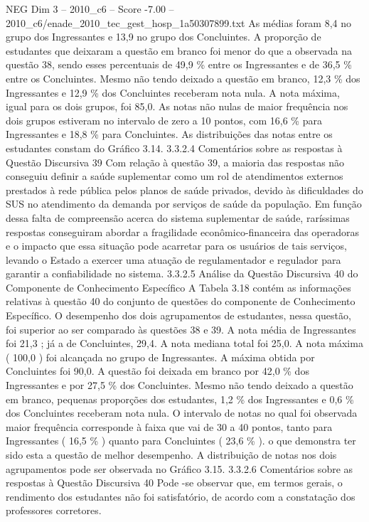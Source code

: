 \begin{textsample}{NEG Dim 3 – 2010\_c6 – Score -7.00 – 2010\_c6/enade\_2010\_tec\_gest\_hosp\_1a50307899.txt}
As médias foram 8,4 no grupo dos Ingressantes e 13,9 no grupo dos Concluintes.
A proporção de estudantes que deixaram a questão em branco foi menor do que a observada na questão 38, sendo esses percentuais de 49,9 \% entre os Ingressantes e de 36,5 \% entre os Concluintes.
Mesmo não tendo deixado a questão em branco, 12,3 \% dos Ingressantes e 12,9 \% dos Concluintes receberam nota nula.
A nota máxima, igual para os dois grupos, foi 85,0.
As notas não nulas de maior frequência nos dois grupos estiveram no intervalo de zero a 10 pontos, com 16,6 \% para Ingressantes e 18,8 \% para Concluintes.
As distribuições das notas entre os estudantes constam do Gráfico 3.14. 3.3.2.4 Comentários sobre as respostas à Questão Discursiva 39 Com relação à questão 39, a maioria das respostas não conseguiu definir a saúde suplementar como um rol de atendimentos externos prestados à rede pública pelos planos de saúde privados, devido às dificuldades do SUS no atendimento da demanda por serviços de saúde da população.
Em função dessa falta de compreensão acerca do sistema suplementar de saúde, raríssimas respostas conseguiram abordar a fragilidade econômico-financeira das operadoras e o impacto que essa situação pode acarretar para os usuários de tais serviços, levando o Estado a exercer uma atuação de regulamentador e regulador para garantir a confiabilidade no sistema. 3.3.2.5 Análise da Questão Discursiva 40 do Componente de Conhecimento Específico A Tabela 3.18 contém as informações relativas à questão 40 do conjunto de questões do componente de Conhecimento Específico.
O desempenho dos dois agrupamentos de estudantes, nessa questão, foi superior ao ser comparado às questões 38 e 39.
A nota média de Ingressantes foi 21,3 ; já a de Concluintes, 29,4.
A nota mediana total foi 25,0.
A nota máxima ( 100,0 ) foi alcançada no grupo de Ingressantes.
A máxima obtida por Concluintes foi 90,0.
A questão foi deixada em branco por 42,0 \% dos Ingressantes e por 27,5 \% dos Concluintes.
Mesmo não tendo deixado a questão em branco, pequenas proporções dos estudantes, 1,2 \% dos Ingressantes e 0,6 \% dos Concluintes receberam nota nula.
O intervalo de notas no qual foi observada maior frequência corresponde à faixa que vai de 30 a 40 pontos, tanto para Ingressantes ( 16,5 \% ) quanto para Concluintes ( 23,6 \% ). o que demonstra ter sido esta a questão de melhor desempenho.
A distribuição de notas nos dois agrupamentos pode ser observada no Gráfico 3.15. 3.3.2.6 Comentários sobre as respostas à Questão Discursiva 40 Pode -se observar que, em termos gerais, o rendimento dos estudantes não foi satisfatório, de acordo com a constatação dos professores corretores.

\end{textsample}
